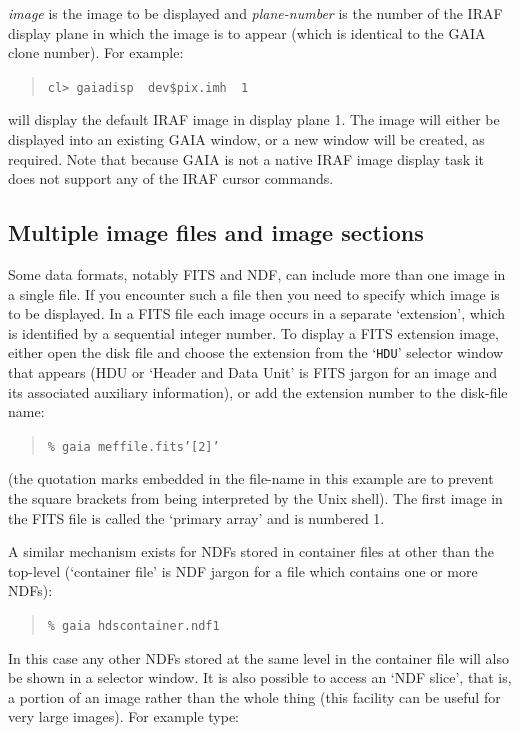 \documentclass[twoside,11pt]{article}
\renewcommand{\_}{\texttt{\symbol{95}}}
\begin{document}
{\it image}\/ is the image to be displayed and {\it plane-number}\/ is
the number of the IRAF display plane in which the image is to appear
(which is identical to the GAIA clone number).  For example:

\begin{quote}
{\tt cl>  gaiadisp ~dev\$pix.imh ~1}
\end{quote}

will display the default IRAF image in display plane 1.  The image will
either be displayed into an existing GAIA window, or a new window will
be created, as required.  Note that because GAIA is not a native IRAF
image display task it does not support any of the IRAF cursor commands.

\subsection{\label{MULT}Multiple image files and image sections}

Some data formats, notably FITS and NDF, can include more than one
image in a single file.  If you encounter such a file then you need to
specify which image is to be displayed.  In a FITS file each image occurs
in a separate `extension', which is identified by a sequential integer
number.  To display a FITS extension image, either open the disk file and
choose the extension from the `{\tt HDU}' selector window that appears
(HDU or `Header and Data Unit' is FITS jargon for an image and its associated
auxiliary information), or add the extension number to the disk-file name:

\begin{quote}
{\tt \% gaia mef\_file.fits'[2]'}
\end{quote}

(the quotation marks embedded in the file-name in this example are to
prevent the square brackets from being interpreted by the Unix shell).
The first image in the FITS file is called the `primary array' and is
numbered 1.

A similar mechanism exists for NDFs stored in container files at other
than the top-level (`container file' is NDF jargon for a file which
contains one or more NDFs):

\begin{quote}
{\tt \% gaia hdscontainer.ndf\_1}
\end{quote}

In this case any other NDFs stored at the same level in the container
file will also be shown in a selector window.  It is also possible to
access an `NDF slice', that is, a portion of an image rather than the
whole thing (this facility can be useful for very large images).  For
example type:
\end{document}
